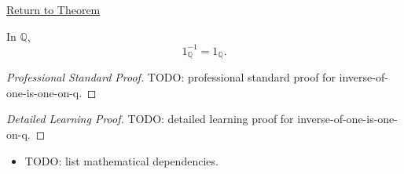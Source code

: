 \newpage
{}
\label{prf:inverse-of-one-is-one-on-q}

\begin{remark*}[Return]
\hyperref[cor:inverse-of-one-is-one-on-q]{Return to Theorem}
\end{remark*}

\begin{corollary*}
In $\mathbb{Q}$,
\[
1_{\mathbb{Q}}^{-1}=1_{\mathbb{Q}}.
\]
\end{corollary*}

\begin{proof}[Professional Standard Proof]
\LRAProofBodyStart
TODO: professional standard proof for inverse-of-one-is-one-on-q.
\end{proof}

\begin{proof}[Detailed Learning Proof]
\LRAProofBodyStart
TODO: detailed learning proof for inverse-of-one-is-one-on-q.
\end{proof}

\begin{remark*}
\end{remark*}

\begin{dependencies}
\begin{itemize}
  \item TODO: list mathematical dependencies.
\end{itemize}
\end{dependencies}

\clearpage
